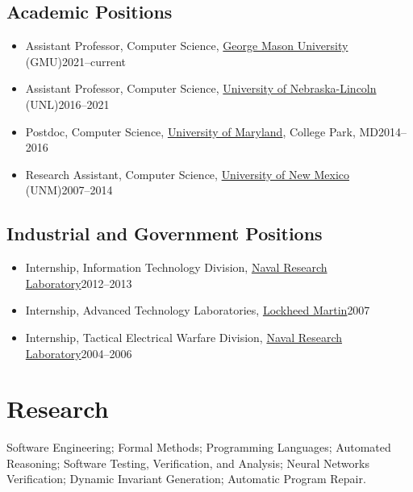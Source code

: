 \documentclass[11pt]{article}
\begin{document}
\subsection{Academic Positions}

\begin{itemize}
    
\item Assistant Professor, Computer Science, \href{https://cs.gmu.edu}{George Mason University} (GMU)\hfill 2021--current  
\item Assistant Professor, Computer Science, \href{https://computing.unl.edu}{University of Nebraska-Lincoln} (UNL)\hfill 2016--2021
\item Postdoc, Computer Science,  \href{https://www.umd.edu}{University of Maryland}, College Park, MD\hfill 2014--2016
\item Research Assistant, Computer Science, \href{https://www.cs.unm.edu}{University of New Mexico} (UNM)\hfill 2007--2014
\end{itemize}

\subsection{Industrial and Government Positions}
\begin{itemize}
\item Internship, Information Technology Division, \href{https://www.nrl.navy.mil}{Naval Research Laboratory}\hfill 2012--2013
\item Internship, Advanced Technology Laboratories, \href{https://lockheedmartin.com/en-us/capabilities/research-labs/advanced-technology-labs.html}{Lockheed Martin}\hfill 2007
\item Internship, Tactical Electrical Warfare Division,  \href{https://www.nrl.navy.mil}{Naval Research Laboratory}\hfill 2004--2006
\end{itemize}

  
\section{Research}

  \begin{description}[before=\small]
  \item Software Engineering; Formal Methods; Programming Languages; Automated Reasoning; Software Testing, Verification, and Analysis; Neural Networks Verification; Dynamic Invariant Generation; Automatic Program Repair.  
    \end{description}
\end{document}
